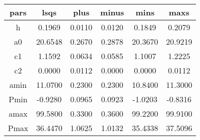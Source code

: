 \begin{table}
\begin{tabular}{cccccc}
\hline \hline
pars & lsqs & plus & minus & mins & maxs \\
\hline
h & 0.1969 & 0.0110 & 0.0120 & 0.1849 & 0.2079 \\
a0 & 20.6548 & 0.2670 & 0.2878 & 20.3670 & 20.9219 \\
c1 & 1.1592 & 0.0634 & 0.0585 & 1.1007 & 1.2225 \\
c2 & 0.0000 & 0.0112 & 0.0000 & 0.0000 & 0.0112 \\
amin & 11.0700 & 0.2300 & 0.2300 & 10.8400 & 11.3000 \\
Pmin & -0.9280 & 0.0965 & 0.0923 & -1.0203 & -0.8316 \\
amax & 99.5800 & 0.3300 & 0.3600 & 99.2200 & 99.9100 \\
Pmax & 36.4470 & 1.0625 & 1.0132 & 35.4338 & 37.5096 \\
\hline
\end{tabular}
\end{table}
